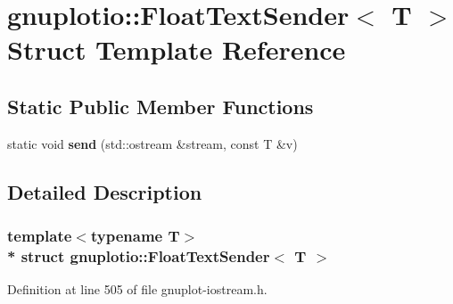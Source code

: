 \hypertarget{structgnuplotio_1_1_float_text_sender}{}\section{gnuplotio\+:\+:Float\+Text\+Sender$<$ T $>$ Struct Template Reference}
\label{structgnuplotio_1_1_float_text_sender}
\subsection*{Static Public Member Functions}
\begin{DoxyCompactItemize}
\item 
static void {\bfseries send} (std\+::ostream \&stream, const T \&v)\hypertarget{structgnuplotio_1_1_float_text_sender_aed6b6c3a95b1396688800d6d1f2fc299}{}\label{structgnuplotio_1_1_float_text_sender_aed6b6c3a95b1396688800d6d1f2fc299}

\end{DoxyCompactItemize}


\subsection{Detailed Description}
\subsubsection*{template$<$typename T$>$\\*
struct gnuplotio\+::\+Float\+Text\+Sender$<$ T $>$}



Definition at line 505 of file gnuplot-\/iostream.\+h.

